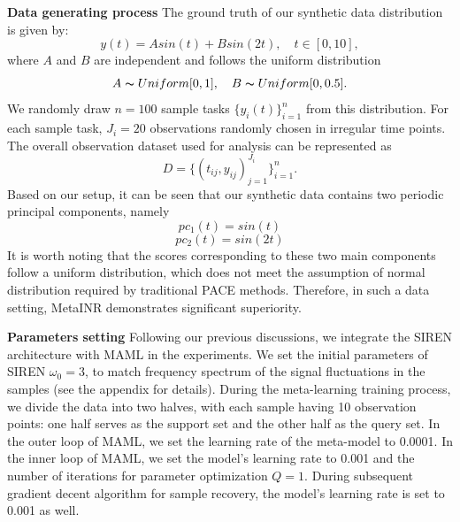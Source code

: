 \documentclass{article}
\begin{document}


\textbf{Data generating process}
The ground truth of our synthetic data distribution is given by:
$$
y(t)=A sin(t)+ B sin(2t), \quad t \in [0,10],
$$
where $A$ and $B$ are independent and follows the uniform distribution
$$
A \thicksim Uniform[0,1], \quad B \thicksim Uniform[0,0.5].
$$
We randomly draw $n=100$ sample tasks $\{y_i(t)\}_{i=1}^n$ from this distribution.
For each sample task, $J_i=20$ observations randomly chosen in irregular time points.
The overall observation dataset used for analysis can be represented as
$$
D=\{(t_{ij},y_{ij})_{j=1}^{J_i}\}_{i=1}^n.
$$
Based on our setup, it can be seen that our synthetic data contains two periodic principal components, namely
$$
pc_1(t)=sin(t)
$$
$$
pc_2(t)=sin(2t)
$$
It is worth noting that the scores corresponding to these two main components follow a uniform distribution, 
which does not meet the assumption of normal distribution required by traditional PACE methods. 
Therefore, in such a data setting, MetaINR demonstrates significant superiority.

\textbf{Parameters setting} 
Following our previous discussions, we integrate the SIREN architecture with MAML in the experiments. 
We set the initial parameters of SIREN $\omega_0=3$, to match frequency spectrum of the signal fluctuations in the samples (see the appendix for details).
During the meta-learning training process, we divide the data into two halves, with each sample having 10 observation points: one half serves as the support set and the other half as the query set.
In the outer loop of MAML, we set the learning rate of the meta-model to 0.0001. 
In the inner loop of MAML, we set the model's learning rate to 0.001 and the number of iterations for parameter optimization $Q=1$.
During subsequent gradient decent algorithm for sample recovery, the model's learning rate is set to 0.001 as well.
\end{document}
